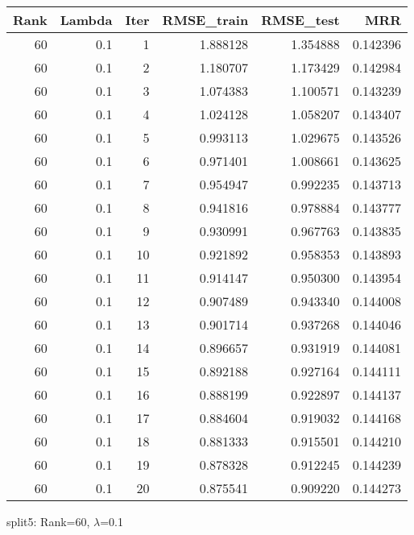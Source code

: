 \begin{tabular}{rrrrrr}
\toprule
 Rank &  Lambda &  Iter &  RMSE\_train &  RMSE\_test &       MRR \\
\midrule
   60 &     0.1 &     1 &    1.888128 &   1.354888 &  0.142396 \\
   60 &     0.1 &     2 &    1.180707 &   1.173429 &  0.142984 \\
   60 &     0.1 &     3 &    1.074383 &   1.100571 &  0.143239 \\
   60 &     0.1 &     4 &    1.024128 &   1.058207 &  0.143407 \\
   60 &     0.1 &     5 &    0.993113 &   1.029675 &  0.143526 \\
   60 &     0.1 &     6 &    0.971401 &   1.008661 &  0.143625 \\
   60 &     0.1 &     7 &    0.954947 &   0.992235 &  0.143713 \\
   60 &     0.1 &     8 &    0.941816 &   0.978884 &  0.143777 \\
   60 &     0.1 &     9 &    0.930991 &   0.967763 &  0.143835 \\
   60 &     0.1 &    10 &    0.921892 &   0.958353 &  0.143893 \\
   60 &     0.1 &    11 &    0.914147 &   0.950300 &  0.143954 \\
   60 &     0.1 &    12 &    0.907489 &   0.943340 &  0.144008 \\
   60 &     0.1 &    13 &    0.901714 &   0.937268 &  0.144046 \\
   60 &     0.1 &    14 &    0.896657 &   0.931919 &  0.144081 \\
   60 &     0.1 &    15 &    0.892188 &   0.927164 &  0.144111 \\
   60 &     0.1 &    16 &    0.888199 &   0.922897 &  0.144137 \\
   60 &     0.1 &    17 &    0.884604 &   0.919032 &  0.144168 \\
   60 &     0.1 &    18 &    0.881333 &   0.915501 &  0.144210 \\
   60 &     0.1 &    19 &    0.878328 &   0.912245 &  0.144239 \\
   60 &     0.1 &    20 &    0.875541 &   0.909220 &  0.144273 \\
\bottomrule
\end{tabular}

\caption{split5: Rank=60, $\lambda$=0.1}
